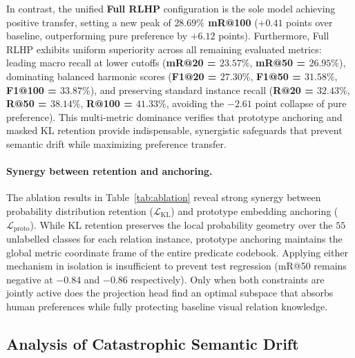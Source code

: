 \documentclass[10pt,twocolumn,letterpaper]{article}
\begin{document}
In contrast, the unified \textbf{Full RLHP} configuration is the sole model achieving positive transfer, setting a new peak of \textbf{$28.69\%$ mR@100} ($+0.41$ points over baseline, outperforming pure preference by $+6.12$ points). Furthermore, Full RLHP exhibits uniform superiority across all remaining evaluated metrics: leading macro recall at lower cutoffs (\textbf{mR@20 = $23.57\%$}, \textbf{mR@50 = $26.95\%$}), dominating balanced harmonic scores (\textbf{F1@20 = $27.30\%$}, \textbf{F1@50 = $31.58\%$}, \textbf{F1@100 = $33.87\%$}), and preserving standard instance recall (\textbf{R@20 = $32.43\%$}, \textbf{R@50 = $38.14\%$}, \textbf{R@100 = $41.33\%$}, avoiding the $-2.61$ point collapse of pure preference). This multi-metric dominance verifies that prototype anchoring and masked KL retention provide indispensable, synergistic safeguards that prevent semantic drift while maximizing preference transfer.

\paragraph{Synergy between retention and anchoring.}
The ablation results in Table~\ref{tab:ablation} reveal strong synergy between probability distribution retention ($\mathcal{L}_{\mathrm{KL}}$) and prototype embedding anchoring ($\mathcal{L}_{\mathrm{proto}}$). While KL retention preserves the local probability geometry over the $55$ unlabelled classes for each relation instance, prototype anchoring maintains the global metric coordinate frame of the entire predicate codebook. Applying either mechanism in isolation is insufficient to prevent test regression (mR@50 remains negative at $-0.84$ and $-0.86$ respectively). Only when both constraints are jointly active does the projection head find an optimal subspace that absorbs human preferences while fully protecting baseline visual relation knowledge.

\subsection{Analysis of Catastrophic Semantic Drift}
\label{sec:semantic_drift}
\end{document}
